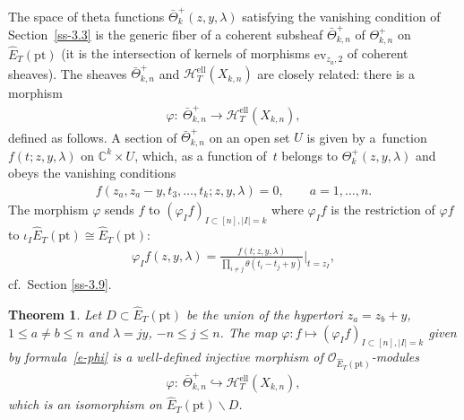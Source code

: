 \documentclass[pdftex]{sigma}
\numberwithin{equation}{section}
\newtheorem{Theorem}{Theorem}[section]
\begin{document}
The space of theta functions $\bar\Theta^+_k(z,y,\lambda)$ satisfying the vanishing condition of Section~\ref{ss-3.3} is the generic fiber of a coherent subsheaf $\bar\Theta^+_{k,n}$ of $\Theta^+_{k,n}$ on $\hat E_T(\mathrm{pt})$ (it is the intersection of kernels of morphisms $\mathrm{ev}_{z_a,2}$ of coherent sheaves). The sheaves $\bar\Theta^+_{k,n}$ and $\mathcal H_T^{\mathrm{ell}}(X_{k,n})$ are closely related: there is a morphism
\begin{gather*}
 \varphi\colon \ \bar\Theta^+_{k,n}\to \mathcal H_T^{\mathrm{ell}}(X_{k,n}),
\end{gather*}
defined as follows. A section of $\bar\Theta^+_{k,n}$ on an open set $U$ is given by a~function $f(t;z,y,\lambda)$ on $\mathbb C^k\times U$, which, as a function of~$t$ belongs to $\Theta^+_k(z,y,\lambda)$ and obeys the vanishing conditions
\begin{gather*}
 f(z_a,z_a-y,t_3,\dots,t_k;z,y,\lambda)=0, \qquad a=1,\dots,n.
\end{gather*}
The morphism $\varphi$ sends $f$ to $(\varphi_If)_{I\subset [n],|I|=k}$ where $\varphi_If$ is the restriction of $\varphi f$ to $\iota_I \hat E_T(\mathrm{pt})\cong\hat E_T(\mathrm{pt})$:
\begin{gather}\label{e-phi}
 \varphi_If(z,y,\lambda)= \frac{f(t;z,y,\lambda)}{\prod\limits_{i\neq j} \theta(t_i-t_j+y)}\bigg|_{t=z_I},
\end{gather}
cf.~Section \ref{ss-3.9}.
\begin{Theorem}\label{th-0} Let $D\subset \hat E_T(\mathrm{pt})$ be the union of the hypertori $z_a=z_b+y$, $1\leq a\neq b\leq n$ and $\lambda=jy$, $-n\leq j\leq n$. The map $\varphi\colon f\mapsto (\varphi_If)_{I\subset [n], |I|=k}$ given by formula~\eqref{e-phi} is a well-defined injective morphism of $\mathcal O_{\hat E_{T}(\mathrm{pt})}$-modules
 \begin{gather*}
 \varphi\colon \ \bar\Theta^+_{k,n}\hookrightarrow \mathcal H^{\mathrm{ell}}_T(X_{k,n}),
 \end{gather*}
 which is an isomorphism on $\hat E_T(\mathrm{pt})\smallsetminus D$.
\end{Theorem}
\end{document}
